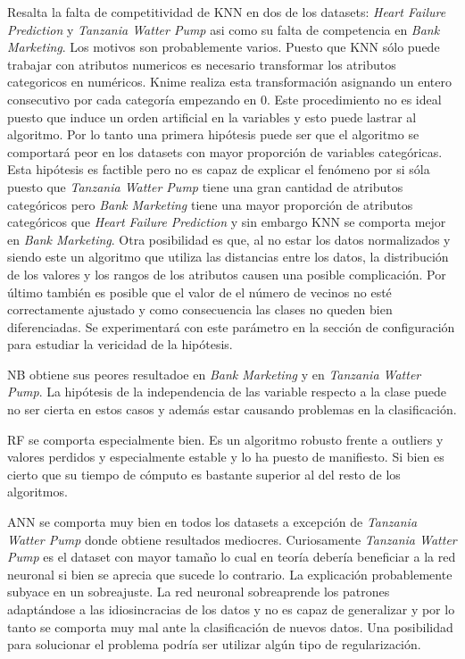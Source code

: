 \documentclass[..]{subfiles}
\begin{document}
Resalta la falta de competitividad de KNN en dos de los datasets: \textit{Heart Failure Prediction} y \textit{Tanzania Watter Pump} asi como su falta de competencia en \textit{Bank Marketing}. Los motivos son probablemente varios. Puesto que KNN sólo puede trabajar con atributos numericos es necesario transformar los atributos categoricos en numéricos. Knime realiza esta transformación asignando un entero consecutivo por cada categoría empezando en 0. Este procedimiento no es ideal puesto que induce un orden artificial en la variables y esto puede lastrar al algoritmo. Por lo tanto una primera hipótesis puede ser que el algoritmo se comportará peor en los datasets con mayor proporción de variables categóricas. Esta hipótesis es factible pero no es capaz de explicar el fenómeno por si sóla puesto que \textit{Tanzania Watter Pump} tiene una gran cantidad de atributos categóricos pero \textit{Bank Marketing} tiene una mayor proporción de atributos categóricos que \textit{Heart Failure Prediction} y sin embargo KNN se comporta mejor en \textit{Bank Marketing}. Otra posibilidad es que, al no estar los datos normalizados y siendo este un algoritmo que utiliza las distancias entre los datos, la distribución de los valores y los rangos de los atributos causen una posible complicación. Por último también es posible que el valor de el número de vecinos no esté correctamente ajustado y como consecuencia las clases no queden bien diferenciadas. Se experimentará con este parámetro en la sección de configuración para estudiar la vericidad de la hipótesis.

NB obtiene sus peores resultadoe en \textit{Bank Marketing} y en \textit{Tanzania Watter Pump}. La hipótesis de la independencia de las variable respecto a la clase puede no ser cierta en estos casos y además estar causando problemas en la clasificación.

RF se comporta especialmente bien. Es un algoritmo robusto frente a outliers y valores perdidos y especialmente estable y lo ha puesto de manifiesto. Si bien es cierto que su tiempo de cómputo es bastante superior al del resto de los algoritmos.

ANN se comporta muy bien en todos los datasets a excepción de \textit{Tanzania Watter Pump} donde obtiene resultados mediocres. Curiosamente \textit{Tanzania Watter Pump} es el dataset con mayor tamaño lo cual en teoría debería beneficiar a la red neuronal si bien se aprecia que sucede lo contrario. La explicación probablemente subyace en un sobreajuste. La red neuronal sobreaprende los patrones adaptándose a las idiosincracias de los datos y no es capaz de generalizar y por lo tanto se comporta muy mal ante la clasificación de nuevos datos. Una posibilidad para solucionar el problema podría ser utilizar algún tipo de regularización.
 
\end{document}
